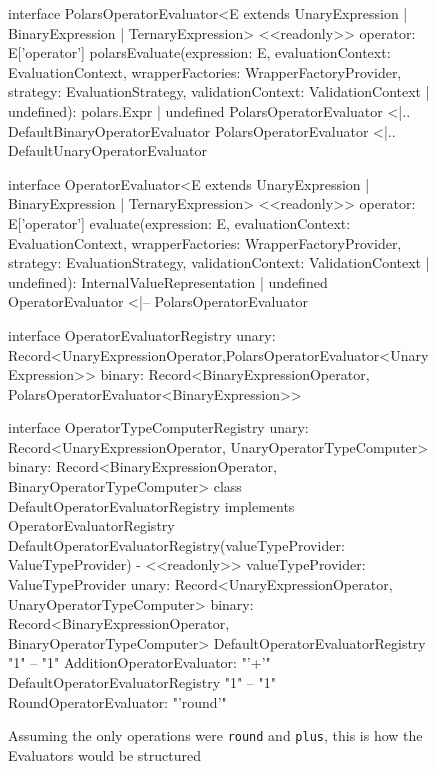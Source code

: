 \begin{figure}
\begin{plantuml}
		interface PolarsOperatorEvaluator<E extends UnaryExpression | BinaryExpression | TernaryExpression> {
				<<readonly>> operator: E['operator']
				polarsEvaluate(expression: E, evaluationContext: EvaluationContext, wrapperFactories: WrapperFactoryProvider, strategy: EvaluationStrategy, validationContext: ValidationContext | undefined): polars.Expr | undefined
			}
		PolarsOperatorEvaluator <|.. DefaultBinaryOperatorEvaluator
		PolarsOperatorEvaluator <|.. DefaultUnaryOperatorEvaluator

		interface OperatorEvaluator<E extends UnaryExpression | BinaryExpression | TernaryExpression> {
				<<readonly>> operator: E['operator']
				evaluate(expression: E, evaluationContext: EvaluationContext, wrapperFactories: WrapperFactoryProvider, strategy: EvaluationStrategy, validationContext: ValidationContext | undefined): InternalValueRepresentation | undefined
			}
		OperatorEvaluator <|-- PolarsOperatorEvaluator

		interface OperatorEvaluatorRegistry {
				unary: Record<UnaryExpressionOperator,PolarsOperatorEvaluator<UnaryExpression>>
				binary: Record<BinaryExpressionOperator, PolarsOperatorEvaluator<BinaryExpression>>
			}

		interface OperatorTypeComputerRegistry {
				unary: Record<UnaryExpressionOperator, UnaryOperatorTypeComputer>
				binary: Record<BinaryExpressionOperator, BinaryOperatorTypeComputer>
			}
		class DefaultOperatorEvaluatorRegistry implements OperatorEvaluatorRegistry {
				DefaultOperatorEvaluatorRegistry(valueTypeProvider: ValueTypeProvider)
				- <<readonly>> valueTypeProvider: ValueTypeProvider
				unary: Record<UnaryExpressionOperator, UnaryOperatorTypeComputer>
				binary: Record<BinaryExpressionOperator, BinaryOperatorTypeComputer>
			}
		DefaultOperatorEvaluatorRegistry "1" -- "1" AdditionOperatorEvaluator: "'+'"
		DefaultOperatorEvaluatorRegistry "1" -- "1" RoundOperatorEvaluator: "'round'"
	\end{plantuml}
	\caption{Assuming the only operations were \Verb|round| and \Verb|plus|, this is how the Evaluators would be structured}
	\label{fig:evaluators_class_diagram}
\end{figure}



